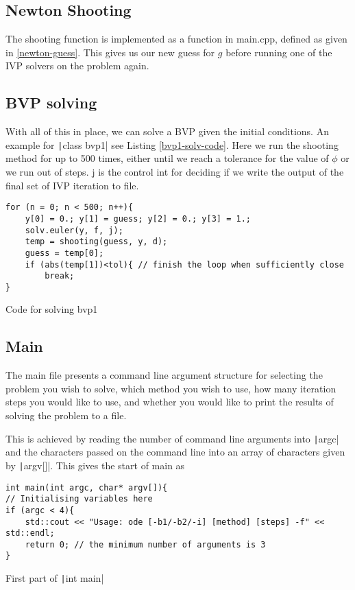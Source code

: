 \documentclass[a4paper,11pt]{report}
\begin{document}
\subsection{Newton Shooting}

The shooting function is implemented as a function in main.cpp, defined as given in \ref{newton-guess}. This gives us our new guess for $g$ before running one of the IVP solvers on the problem again.

\subsection{BVP solving}

With all of this in place, we can solve a BVP given the initial conditions. An example for \texttt|class bvp1| see Listing \ref{bvp1-solv-code}. Here we run the shooting method for up to 500 times, either until we reach a tolerance for the value of $\phi$ or we run out of steps. j is the control int for deciding if we write the output of the final set of IVP iteration to file.

\begin{listing}
\begin{verbatim}
for (n = 0; n < 500; n++){
	y[0] = 0.; y[1] = guess; y[2] = 0.; y[3] = 1.;
	solv.euler(y, f, j);
	temp = shooting(guess, y, d);
	guess = temp[0];
	if (abs(temp[1])<tol){ // finish the loop when sufficiently close
		break;
}
\end{verbatim}
\caption{Code for solving bvp1}
\label{bvp1-solv-code}
\end{listing}

\subsection{Main}

The main file presents a command line argument structure for selecting the problem you wish to solve, which method you wish to use, how many iteration steps you would like to use, and whether you would like to print the results of solving the problem to a file.

This is achieved by reading the number of command line arguments into \texttt|argc| and the characters passed on the command line into an array of characters given by \texttt|argv[]|. This gives the start of main as

\begin{listing}
\begin{verbatim}
int main(int argc, char* argv[]){
// Initialising variables here
if (argc < 4){
	std::cout << "Usage: ode [-b1/-b2/-i] [method] [steps] -f" << std::endl;
	return 0; // the minimum number of arguments is 3
}
\end{verbatim}
\caption{First part of \texttt|int main|}
\end{listing}
\end{document}
